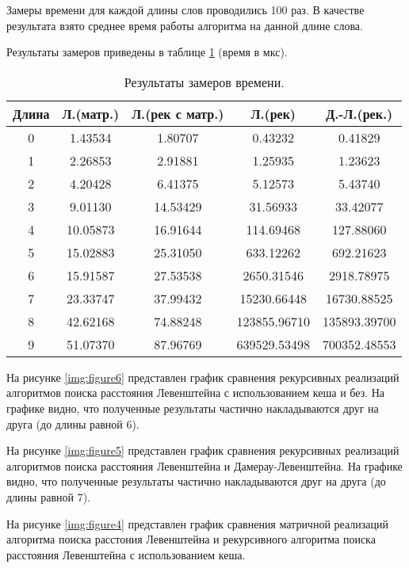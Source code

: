 Замеры времени для каждой длины слов проводились 100 раз. В качестве результата взято среднее время работы алгоритма на данной длине слова.

Результаты замеров приведены в таблице \ref{tab:time} (время в мкс).

\begin{table}[h]
	\begin{center}
		\caption{\label{tab:time}Результаты замеров времени.}
		\begin{tabular}{|c|c|c|c|c|}
			
			\hline
			Длина & Л.(матр.)& Л.(рек с матр.) & Л.(рек)  & Д.-Л.(рек.)  \\
			\hline
			0 & 1.43534 & 1.80707 & 0.43232 & 0.41829 \\
			\hline
			1 & 2.26853 & 2.91881 & 1.25935 & 1.23623 \\
			\hline
			2 & 4.20428 & 6.41375 & 5.12573 & 5.43740 \\
			\hline
			3 & 9.01130 & 14.53429 & 31.56933 & 33.42077 \\
			\hline
			4 & 10.05873 & 16.91644 & 114.69468 & 127.88060 \\
			\hline
			5 & 15.02883 & 25.31050 & 633.12262 & 692.21623 \\
			\hline
			6 & 15.91587 & 27.53538 & 2650.31546 & 2918.78975 \\
			\hline
			7 & 23.33747 & 37.99432 & 15230.66448 & 16730.88525 \\
			\hline
			8 & 42.62168 & 74.88248 & 123855.96710 & 135893.39700 \\
			\hline
			9 & 51.07370 & 87.96769 & 639529.53498 & 700352.48553 \\
			\hline
		\end{tabular}
	\end{center}
\end{table}

На рисунке \ref{img:figure6} представлен график сравнения рекурсивных реализаций алгоритмов поиска расстояния Левенштейна с использованием кеша и без. На графике видно, что полученные результаты частично накладываются друг на друга (до длины равной 6).

На рисунке \ref{img:figure5} представлен график сравнения рекурсивных реализаций алгоритмов поиска расстояния Левенштейна и Дамерау-Левенштейна. На графике видно, что полученные результаты частично накладываются друг на друга (до длины равной 7).

На рисунке \ref{img:figure4} представлен график сравнения матричной реализаций алгоритма поиска расстония Левенштейна и рекурсивного алгоритма поиска расстояния Левенштейна с использованием кеша.

